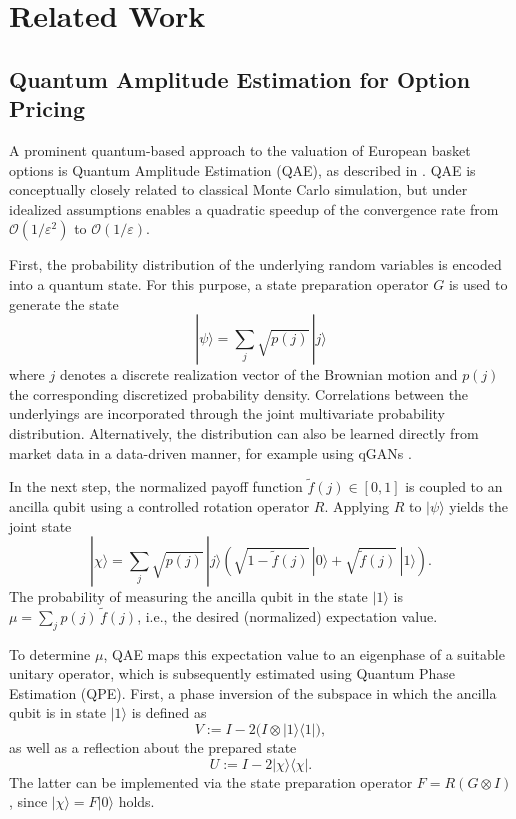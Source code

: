 \chapter{Related Work}
\label{sec:related-work}

\section{Quantum Amplitude Estimation for Option Pricing}

A prominent quantum-based approach to the valuation of European basket options is Quantum Amplitude Estimation (QAE), as described in \cite{stamatopoulos2020option}. QAE is conceptually closely related to classical Monte Carlo simulation, but under idealized assumptions enables a quadratic speedup of the convergence rate from $\mathcal O(1/\varepsilon^2)$ to $\mathcal O(1/\varepsilon)$.

First, the probability distribution of the underlying random variables is encoded into a quantum state. For this purpose, a state preparation operator $G$ is used to generate the state
\begin{equation}
    |\psi\rangle = \sum_j \sqrt{p(j)}\,|j\rangle
\end{equation}
where $j$ denotes a discrete realization vector of the Brownian motion and $p(j)$ the corresponding discretized probability density. Correlations between the underlyings are incorporated through the joint multivariate probability distribution. Alternatively, the distribution can also be learned directly from market data in a data-driven manner, for example using qGANs \cite{zoufal2019quantum}.

In the next step, the normalized payoff function $\tilde f(j)\in[0,1]$ is coupled to an ancilla qubit using a controlled rotation operator $R$. Applying $R$ to $|\psi\rangle$ yields the joint state
\begin{equation}
    |\chi\rangle
    =
    \sum_j \sqrt{p(j)}\,|j\rangle
    \left(
        \sqrt{1-\tilde f(j)}\,|0\rangle
        +
        \sqrt{\tilde f(j)}\,|1\rangle
    \right).
\end{equation}
The probability of measuring the ancilla qubit in the state $|1\rangle$ is $\mu = \sum_j p(j)\,\tilde f(j)$, i.e., the desired (normalized) expectation value.

To determine $\mu$, QAE maps this expectation value to an eigenphase of a suitable unitary operator, which is subsequently estimated using Quantum Phase Estimation (QPE). First, a phase inversion of the subspace in which the ancilla qubit is in state $|1\rangle$ is defined as
\begin{equation}
    V := I - 2\bigl(I \otimes |1\rangle\langle 1|\bigr),
\end{equation}
as well as a reflection about the prepared state
\begin{equation}
    U := I - 2|\chi\rangle\langle\chi|.
\end{equation}
The latter can be implemented via the state preparation operator $F = R(G\otimes I)$, since $|\chi\rangle = F|0\rangle$ holds.

